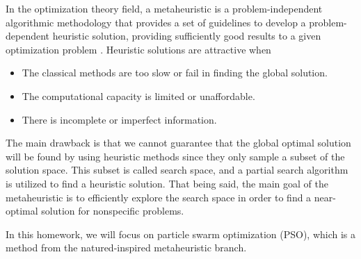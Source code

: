 \documentclass[12pt,a4paper]{article}
\begin{document}

In the optimization theory field, a metaheuristic is a problem-independent algorithmic methodology that provides a set of guidelines to develop a problem-dependent heuristic solution, providing sufficiently good results to a given optimization problem \cite{ABDELBASSET2018185}. Heuristic solutions are attractive when
\begin{itemize}
    \item The classical methods are too slow or fail in finding the global solution.
    \item The computational capacity is limited or unaffordable.
    \item There is incomplete or imperfect information.
\end{itemize}

The main drawback is that we cannot guarantee that the global optimal solution will be found by using heuristic methods since they only sample a subset of the solution space. This subset is called search space, and a partial search algorithm is utilized to find a heuristic solution. That being said, the main goal of the metaheuristic is to efficiently explore the search space in order to find a near-optimal solution for nonspecific problems.

In this homework, we will focus on particle swarm optimization (PSO), which is a method from the natured-inspired metaheuristic branch.
\end{document}
